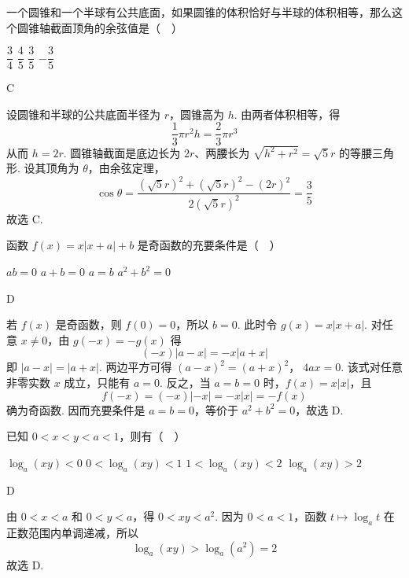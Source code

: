 \begin{problem}
一个圆锥和一个半球有公共底面，如果圆锥的体积恰好与半球的体积相等，那么这个圆锥轴截面顶角的余弦值是（\(\quad\)）

\choices
    {\(\dfrac{3}{4}\)}
    {\(\dfrac{4}{5}\)}
    {\(\dfrac{3}{5}\)}
    {\(-\dfrac{3}{5}\)}
\end{problem}

\begin{answer}
C
\end{answer}

\begin{solution}
设圆锥和半球的公共底面半径为 \(r\)，圆锥高为 \(h\). 由两者体积相等，得
\[
\frac13\pi r^2h=\frac23\pi r^3
\]
从而 \(h=2r\). 圆锥轴截面是底边长为 \(2r\)、两腰长为 \(\sqrt{h^2+r^2}=\sqrt{5}r\) 的等腰三角形. 设其顶角为 \(\theta\)，由余弦定理，
\[
\cos\theta=\frac{(\sqrt{5}r)^2+(\sqrt{5}r)^2-(2r)^2}{2(\sqrt{5}r)^2}=\frac35
\]
故选 C.
\end{solution}

\begin{problem}
函数 \(f(x) = x|x + a| + b\) 是奇函数的充要条件是（\(\quad\)）

\choices
    {\(ab = 0\)}
    {\(a + b = 0\)}
    {\(a = b\)}
    {\(a^2 + b^2 = 0\)}
\end{problem}

\begin{answer}
D
\end{answer}

\begin{solution}
若 \(f(x)\) 是奇函数，则 \(f(0)=0\)，所以 \(b=0\). 此时令 \(g(x)=x|x+a|\). 对任意 \(x\ne0\)，由 \(g(-x)=-g(x)\) 得
\[
(-x)|a-x|=-x|a+x|
\]
即 \(|a-x|=|a+x|\). 两边平方可得
\((a-x)^2=(a+x)^2\)，\(\; 4ax=0\).
该式对任意非零实数 \(x\) 成立，只能有 \(a=0\). 反之，当 \(a=b=0\) 时，\(f(x)=x|x|\)，且
\[
f(-x)=(-x)|-x|=-x|x|=-f(x)
\]
确为奇函数. 因而充要条件是 \(a=b=0\)，等价于 \(a^2+b^2=0\)，故选 D.
\end{solution}

\begin{problem}
已知 \(0 < x < y < a < 1\)，则有（\(\quad\)）

\choices
    {\(\log_a(xy) < 0\)}
    {\(0 < \log_a(xy) < 1\)}
    {\(1 < \log_a(xy) < 2\)}
    {\(\log_a(xy) > 2\)}
\end{problem}

\begin{answer}
D
\end{answer}

\begin{solution}
由 \(0<x<a\) 和 \(0<y<a\)，得 \(0<xy<a^2\). 因为 \(0<a<1\)，函数 \(t\mapsto\log_a t\) 在正数范围内单调递减，所以
\[
\log_a(xy)>\log_a(a^2)=2
\]
故选 D.
\end{solution}

